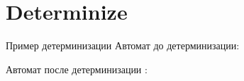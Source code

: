 \section{Determinize}
\begin{frame}{Пример детерминизации}
    Автомат до детерминизации:


    Автомат после детерминизации%
    :

\end{frame}